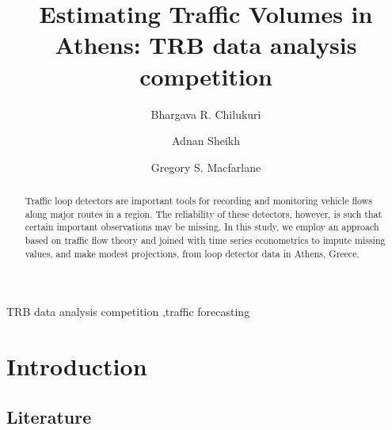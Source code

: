 \documentclass[review, authoryear]{elsarticle}\usepackage{graphicx, color}
\begin{document}
\begin{frontmatter}
\title{Estimating Traffic Volumes in Athens: TRB data analysis competition}

\author[gtcivil]{Bhargava R. Chilukuri}
\author[gtcivil]{Adnan Sheikh}
\author[gtcivil,gtecon]{Gregory S. Macfarlane} 

\address[gtcivil]{School of Civil and Environmental Engineering, Georgia Institute of
Technology\\ 790 Atlantic Drive, Atlanta GA 30332-0355}
\address[gtecon]{School of Economics, Georgia Institute of Technology\\ 221 Bobby
Dodd Way, Atlanta, GA 30332}


\begin{abstract}
Traffic loop detectors are important tools for recording and monitoring vehicle
flows along major routes in a region. The reliability of these detectors, 
however, is such that certain important observations may be missing. In this 
study, we employ an approach based on traffic flow theory and joined with
time series econometrics to impute missing values, and make modest projections,
from loop detector data in Athens, Greece.
\end{abstract}

\begin{keyword}%
TRB data analysis competition \sep traffic forecasting 
\end{keyword}
\end{frontmatter}

\section{Introduction}

\subsection{Literature}


\end{document}
